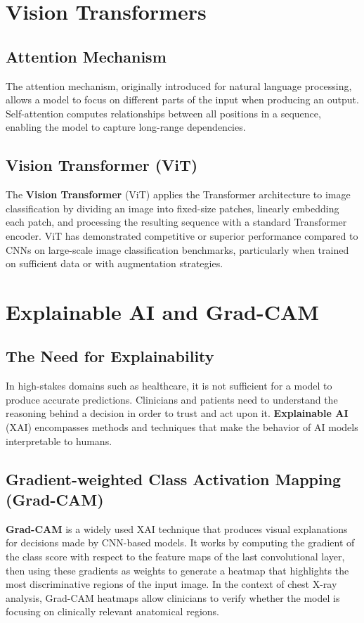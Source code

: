 \documentclass[12pt]{report}
\begin{document}
\section{Vision Transformers}

\subsection{Attention Mechanism}
The attention mechanism, originally introduced for natural language
processing, allows a model to focus on different parts of the input
when producing an output. Self-attention computes relationships between
all positions in a sequence, enabling the model to capture long-range
dependencies.

\subsection{Vision Transformer (ViT)}
The \textbf{Vision Transformer} (ViT) applies the Transformer architecture to
image classification by dividing an image into fixed-size patches, linearly
embedding each patch, and processing the resulting sequence with a standard
Transformer encoder. ViT has demonstrated competitive or superior performance
compared to CNNs on large-scale image classification benchmarks, particularly
when trained on sufficient data or with augmentation strategies.

\section{Explainable AI and Grad-CAM}

\subsection{The Need for Explainability}
In high-stakes domains such as healthcare, it is not sufficient for a
model to produce accurate predictions. Clinicians and patients need to
understand the reasoning behind a decision in order to trust and act
upon it. \textbf{Explainable AI} (XAI) encompasses methods and techniques that
make the behavior of AI models interpretable to humans.

\subsection{Gradient-weighted Class Activation Mapping (Grad-CAM)}
\textbf{Grad-CAM} is a widely used XAI technique that produces visual explanations
for decisions made by CNN-based models. It works by computing the gradient
of the class score with respect to the feature maps of the last
convolutional layer, then using these gradients as weights to generate
a heatmap that highlights the most discriminative regions of the input
image. In the context of chest X-ray analysis, Grad-CAM heatmaps allow
clinicians to verify whether the model is focusing on clinically relevant
anatomical regions.
\end{document}
